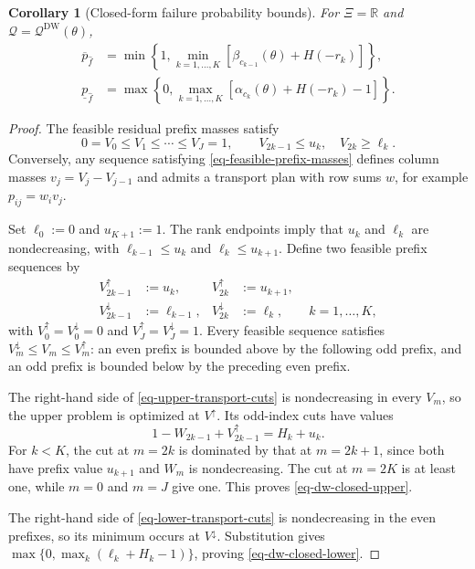 \documentclass[review,11pt,3p,authoryear,nopreprintline]{elsarticle}
\newtheorem{corollary}{Corollary}
\begin{document}
\begin{corollary}[Closed-form failure probability bounds]
  \label{thm-closed-form-bounds}
  For $\Xi=\mathbb R$ and $\mathscr Q=\mathscr Q^{\mathrm{DW}}(\theta)$,
  \begin{align}
    \overline p_{\hat f}
    &=\min\left\{1,\min_{k=1,\ldots,K}
    \left[\beta_{c_{k-1}}(\theta)+H(-r_k)\right]\right\},
    \label{eq-dw-closed-upper}\\
    \underline p_{\hat f}
    &=\max\left\{0,\max_{k=1,\ldots,K}
    \left[\alpha_{c_k}(\theta)+H(-r_k)-1\right]\right\}.
    \label{eq-dw-closed-lower}
  \end{align}
\end{corollary}
\begin{proof}
  The feasible residual prefix masses satisfy
  \begin{equation}
    0=V_0\le V_1\le\cdots\le V_J=1,\qquad
    V_{2k-1}\le u_k,\quad V_{2k}\ge\ell_k.
    \label{eq-feasible-prefix-masses}
  \end{equation}
  Conversely, any sequence satisfying \eqref{eq-feasible-prefix-masses} defines column masses $v_j=V_j-V_{j-1}$ and admits a transport plan with row sums $w$, for example $p_{ij}=w_i v_j$.

  Set $\ell_0:=0$ and $u_{K+1}:=1$. The rank endpoints imply that $u_k$ and $\ell_k$ are nondecreasing, with $\ell_{k-1}\le u_k$ and $\ell_k\le u_{k+1}$. Define two feasible prefix sequences by
  \begin{equation}
    \begin{aligned}
      V^\uparrow_{2k-1}&:=u_k,&
      V^\uparrow_{2k}&:=u_{k+1},\\
      V^\downarrow_{2k-1}&:=\ell_{k-1},&
      V^\downarrow_{2k}&:=\ell_k,
      \qquad k=1,\ldots,K,
    \end{aligned}
    \label{eq-extreme-prefix-vectors}
  \end{equation}
  with $V^\uparrow_0=V^\downarrow_0=0$ and
  $V^\uparrow_J=V^\downarrow_J=1$.
  Every feasible sequence satisfies
  $V^\downarrow_m\le V_m\le V^\uparrow_m$:
  an even prefix is bounded above by the following odd prefix, and an odd prefix is bounded below by the preceding even prefix.

  The right-hand side of \eqref{eq-upper-transport-cuts} is nondecreasing in every $V_m$, so the upper problem is optimized at $V^\uparrow$. Its odd-index cuts have values
  \[
    1-W_{2k-1}+V^\uparrow_{2k-1}=H_k+u_k.
  \]
  For $k<K$, the cut at $m=2k$ is dominated by that at $m=2k+1$, since both have prefix value $u_{k+1}$ and $W_m$ is nondecreasing. The cut at $m=2K$ is at least one, while $m=0$ and $m=J$ give one. This proves \eqref{eq-dw-closed-upper}.

  The right-hand side of \eqref{eq-lower-transport-cuts} is nondecreasing in the even prefixes, so its minimum occurs at $V^\downarrow$. Substitution gives
  $\max\{0,\max_k(\ell_k+H_k-1)\}$, proving \eqref{eq-dw-closed-lower}.
\end{proof}
\end{document}
